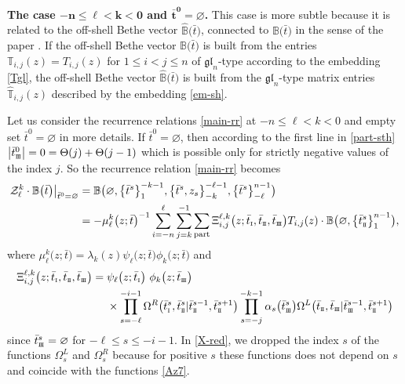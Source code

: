\documentclass[10pt,a4paper]{amsart}
\newcommand{\so}{\scriptscriptstyle \rm I}
\newcommand{\st}{\scriptscriptstyle \rm I\hspace{-1pt}I}
\newcommand{\sth}{\scriptscriptstyle \rm I\hspace{-1pt}I\hspace{-1pt}I}
\newcommand{\bt}{{\bar t}}
\theoremstyle{definition}
\def\BB{{\mathbb{B}}}
\def\hBB{\hat{\mathbb{B}}}
\def\TT{{\mathbb{T}}}
\def\r#1{\eqref{#1}}
\def\Z{\mathcal{Z}}
\def\Oml{\Omega^L}
\def\Omr{\Omega^R}
\begin{document}
{
\bf The case $\boldsymbol{-n\leq \ell<k<0}$ and $\boldsymbol{\bt^0=\varnothing}$.} This case is more subtle
because it is related to the off-shell Bethe vector
$\hBB\bigl(\bt\bigr)$, connected to $\BB\bigl(\bt\bigr)$
in the sense of the paper \cite{LPRS-New}.
If
the off-shell Bethe vector $\BB\bigl(\bt\bigr)$ is built from the entries
$\TT_{i,j}(z)=T_{i,j}(z)$ for $1\leq i<j\leq n$ of $\mathfrak{gl}_n$-type
according to the embedding \r{Tgl},
the off-shell Bethe vector \small{$\hBB\bigl(\bt\bigr)$} is built from the
$\mathfrak{gl}_n$-type matrix entries~$\hat{\TT}_{i,j}(z)$ described
by the embedding \r{em-sh}.

Let us consider the recurrence
relations \r{main-rr} at $-n\leq \ell<k<0$ and empty set $\bt^0=\varnothing$ in
more details.
If $\bt^0=\varnothing$, then according to the
first line in \r{part-sth} $\big|\bt^0_{\sth}\big|=0=\Theta(j)+\Theta(j-1)$ which is possible
only for strictly negative values of the index $j$. So the recurrence
relation \r{main-rr} becomes
\begin{align}
\Z^k_\ell\cdot\BB\bigl(\bt\bigr)\big|_{\bt^0=\varnothing}&=
\BB\bigl(\varnothing,\bigl\{\bt^s\bigr\}_1^{-k-1},\bigl\{\bt^s,z_s\bigr\}_{-k}^{-\ell-1},\bigl\{\bt^s\bigr\}_{-\ell}^{n-1}\bigr)\nonumber\\
&= - \mu^k_\ell\bigl(z;\bt\bigr)^{-1} \sum_{i=-n}^\ell
\sum_{j=k}^{-1}\sum_{\rm part}
\Xi^{\ell,k}_{i,j}\bigl(z;\bt_{\so},\bt_{\st},\bt_{\sth}\bigr)
T_{i,j}(z)\cdot\BB\bigl(\varnothing,\bigl\{\bt^s_{\st}\bigr\}_1^{n-1}\bigr) ,\label{gl1}
\end{align}
where $\mu^k_\ell\bigl(z;\bt\bigr)=\lambda_k(z) \psi_\ell\bigl(z;\bt\bigr) \phi_k\bigl(z;\bt\bigr)$ and
\begin{align}
\Xi^{\ell,k}_{i,j}\bigl(z;\bt_{\so},\bt_{\st},\bt_{\sth}\bigr)={}&
\psi_\ell\bigl(z;\bt_{\so}\bigr)\ \phi_k\bigl(z;\bt_{\sth}\bigr)\nonumber\\
&\times
\prod_{s=-\ell}^{-i-1}\Omr\bigl(\bt^s_{\so},\bt^s_{{\st}}|\bt^{s-1}_{\st},\bt^{s+1}_{\st}\bigr)
\prod_{s=-j}^{-k-1}\alpha_s\bigl(\bt^s_{\sth}\bigr)
\Oml\bigl(\bt_{\st},\bt_{{\sth}}|\bt^{s-1}_{\sth},\bt^{s+1}_{\st}\bigr)\label{X-red}
\end{align}
since $\bt^s_{\sth}=\varnothing$ for $-\ell\leq s\leq -i-1$.
 In \r{X-red}, we dropped the index $s$ of the functions
$\Oml_s$ and $\Omr_s$ because for positive $s$ these functions
does not depend on $s$ and coincide with the functions \r{Az7}.
\end{document}
